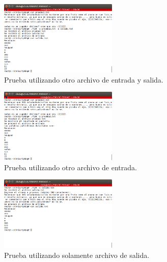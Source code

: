 \documentclass[a4paper]{article}
\begin{document}
\begin{figure}[!htp]
\begin{center}
\includegraphics[width=0.5\textwidth]{prueba3.png}
\caption{Prueba utilizando otro archivo de entrada y salida.} \label{fig001}
\end{center}
\end{figure}

\begin{figure}[!htp]
\begin{center}
\includegraphics[width=0.5\textwidth]{prueba3salidaPorPantalla.png}
\caption{Prueba utilizando otro archivo de entrada.} \label{fig001}
\end{center}
\end{figure}

\begin{figure}[!htp]
\begin{center}
\includegraphics[width=0.5\textwidth]{pruebaPorTeclado.png}
\caption{Prueba utilizando solamente archivo de salida.} \label{fig001}
\end{center}
\end{figure}

\pagebreak
\end{document}
